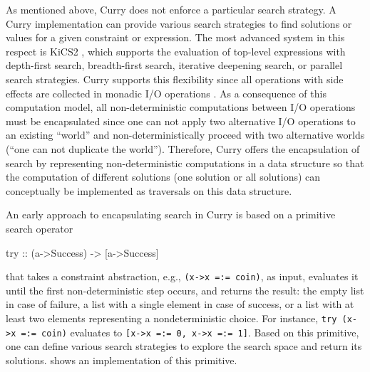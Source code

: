 \documentclass[english]{lni}
\newcommand{\code}[1]{\texttt{\small{}#1}}
\newcommand{\bs}{\char92} %
\begin{document}
As mentioned above, Curry does not enforce a particular search
strategy. A Curry implementation
can provide various search strategies to find solutions
or values for a given constraint or expression.
The most advanced system in this respect is
KiCS2 \cite{BrasselHanusPeemoellerReck11},
which supports the evaluation of top-level expressions
with depth-first search, breadth-first search,
iterative deepening search, or parallel search strategies.
Curry supports this flexibility since all operations with side effects
are collected in monadic I/O operations \cite{Wadler97}.
As a consequence of this computation model,
all non-deterministic computations between I/O operations
must be encapsulated since one can not apply two alternative
I/O operations to an existing ``world''
and non-deterministically proceed with two alternative worlds
(``one can not duplicate the world'').
Therefore, Curry offers the encapsulation of search
by representing non-deterministic computations
in a data structure so that the computation of different solutions
(one solution or all solutions) can conceptually be implemented
as traversals on this data structure.

An early approach
\cite{HanusSteiner98PLILP,Lux99FLOPS}
to encapsulating search in Curry
is based on a primitive search operator
\begin{curry}
try :: (a->Success) -> [a->Success]
\end{curry}
that takes a constraint abstraction, e.g., \code{(\bs{}x->x\,=:=\,coin)},
as input, evaluates it until the first non-deterministic step occurs,
and returns the result: the empty list in case of failure, a list with a single
element in case of success, or a list with at least two elements representing
a nondeterministic choice. For instance,
\code{try\,(\bs{}x->x\,=:=\,coin)} evaluates to
\code{[\bs{}x->x\,=:=\,0,\,\bs{}x->x\,=:=\,1]}.
Based on this primitive, one can define various search strategies
to explore the search space and return its solutions.
\cite{Lux99FLOPS} shows an implementation of this primitive.
\end{document}
